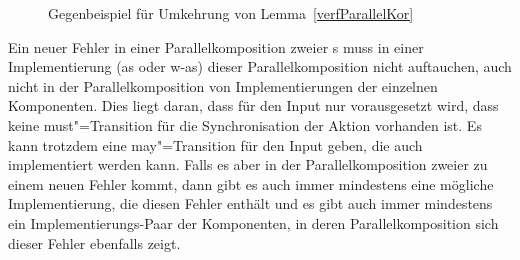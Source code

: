 \begin{figure}[htbp]
  \begin{center}
    \caption{Gegenbeispiel für Umkehrung von Lemma~\ref{verfParallelKor}}
    \label{impParallelFig}
  \end{center}
\end{figure}

Ein neuer Fehler in einer Parallelkomposition zweier \MEIO{}s
muss in einer Implementierung (as oder w-as) dieser Parallelkomposition nicht
auftauchen, auch nicht in der Parallelkomposition von Implementierungen der
einzelnen Komponenten. Dies liegt daran, dass für den Input nur vorausgesetzt
wird, dass keine must"=Transition für die Synchronisation der Aktion vorhanden
ist. Es kann trotzdem eine may"=Transition für den Input geben, die auch
implementiert werden kann. Falls es aber in der Parallelkomposition zweier
\MEIO{} zu einem neuen Fehler kommt, dann gibt es auch immer mindestens eine
mögliche Implementierung, die diesen Fehler enthält und es gibt auch immer
mindestens ein Implementierungs-Paar der Komponenten, in deren
Parallelkomposition sich dieser Fehler ebenfalls zeigt.
